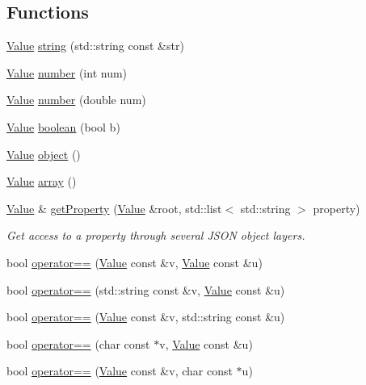 \subsection*{Functions}
\begin{DoxyCompactItemize}
\item 
\hyperlink{classj_1_1_value}{Value} \hyperlink{namespacej_aef5145877fcdcbe9f33fb30797e89972}{string} (std\-::string const \&str)
\item 
\hyperlink{classj_1_1_value}{Value} \hyperlink{namespacej_aa091c7e1a1df53ebf8fad0781be9b35b}{number} (int num)
\item 
\hyperlink{classj_1_1_value}{Value} \hyperlink{namespacej_a4e6121dfadaa6dc1f09b9b046bfd5a1e}{number} (double num)
\item 
\hyperlink{classj_1_1_value}{Value} \hyperlink{namespacej_a3ed18f254a8b594f60d89c37b1d6609e}{boolean} (bool b)
\item 
\hyperlink{classj_1_1_value}{Value} \hyperlink{namespacej_a0a06e9035df506ed37cc689d29259236}{object} ()
\item 
\hyperlink{classj_1_1_value}{Value} \hyperlink{namespacej_a1eb76fa49d1a092cfdfb466c70ec1bca}{array} ()
\item 
\hyperlink{classj_1_1_value}{Value} \& \hyperlink{namespacej_aa0fe671793e7e36abfa8ff95e2fac50f}{get\-Property} (\hyperlink{classj_1_1_value}{Value} \&root, std\-::list$<$ std\-::string $>$ property)
\begin{DoxyCompactList}\small\item\em Get access to a property through several J\-S\-O\-N object layers. \end{DoxyCompactList}\item 
bool \hyperlink{namespacej_ad05f63a8401ccefce8aa113f24aba6ad}{operator==} (\hyperlink{classj_1_1_value}{Value} const \&v, \hyperlink{classj_1_1_value}{Value} const \&u)
\item 
bool \hyperlink{namespacej_acbfb62ab46184e9f8f839ea8973fa562}{operator==} (std\-::string const \&v, \hyperlink{classj_1_1_value}{Value} const \&u)
\item 
bool \hyperlink{namespacej_aa2f9980b3a263681f685f41b292aea9c}{operator==} (\hyperlink{classj_1_1_value}{Value} const \&v, std\-::string const \&u)
\item 
bool \hyperlink{namespacej_ac6098954205f074d66b2ed01268ebf55}{operator==} (char const $\ast$v, \hyperlink{classj_1_1_value}{Value} const \&u)
\item 
bool \hyperlink{namespacej_a826aff11067be4997c84f78cb74965f5}{operator==} (\hyperlink{classj_1_1_value}{Value} const \&v, char const $\ast$u)

\end{DoxyCompactItemize}
